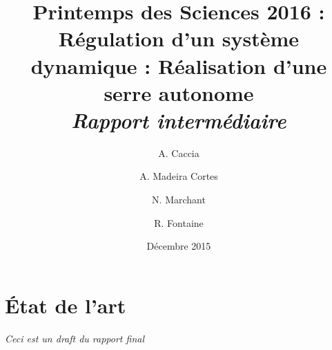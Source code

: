 \documentclass[a4paper,10pt]{report}
\title{Printemps des Sciences 2016 :\\Régulation d'un système dynamique : Réalisation d'une serre autonome\\\textit{Rapport intermédiaire}}
\author{A. Caccia \and A. Madeira Cortes \and N. Marchant \and R. Fontaine}
\date{Décembre 2015}
\begin{document}
\maketitle

\chapter{État de l'art}
\textit{Ceci est un draft du rapport final}









\printbibliography
\end{document}
